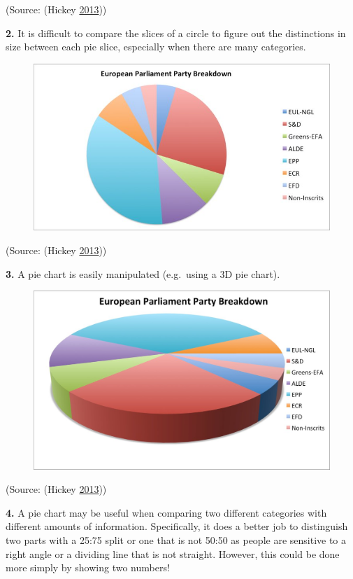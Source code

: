 \documentclass[]{book}
\begin{document}
(Source: (Hickey \protect\hyperlink{ref-hickey-pie-worst}{2013}))

\textbf{2.} It is difficult to compare the slices of a circle to figure
out the distinctions in size between each pie slice, especially when
there are many categories.

\begin{figure}
\centering
\includegraphics{images/hickey-breakdown.jpg}
\caption{}
\end{figure}

(Source: (Hickey \protect\hyperlink{ref-hickey-pie-worst}{2013}))

\textbf{3.} A pie chart is easily manipulated (e.g.~using a 3D pie
chart).

\begin{figure}
\centering
\includegraphics{images/hickey-3D.jpg}
\caption{}
\end{figure}

(Source: (Hickey \protect\hyperlink{ref-hickey-pie-worst}{2013}))

\textbf{4.} A pie chart may be useful when comparing two different
categories with different amounts of information. Specifically, it does
a better job to distinguish two parts with a 25:75 split or one that is
not 50:50 as people are sensitive to a right angle or a dividing line
that is not straight. However, this could be done more simply by showing
two numbers!
\end{document}
